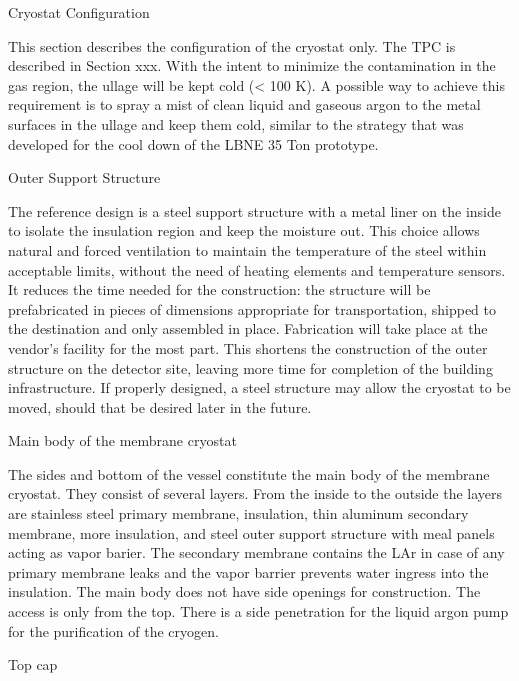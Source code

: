 Cryostat Configuration

This section describes the configuration of the cryostat only. The TPC is described in Section xxx. With the intent to minimize the contamination in the gas region, the ullage will be kept cold (< 100 K). A possible way to achieve this requirement is to spray a mist of clean liquid and gaseous argon to the metal surfaces in the ullage and keep them cold, similar to the strategy that was developed for the cool down of the LBNE 35 Ton prototype.

Outer Support Structure

The reference design is a steel support structure with a metal liner on the inside to isolate the insulation region and keep the moisture out. This choice allows natural and forced ventilation to maintain the temperature of the steel within acceptable limits, without the need of heating elements and temperature sensors. It reduces the time needed for the construction: the structure will be prefabricated in pieces of dimensions appropriate for transportation, shipped to the destination and only assembled in place. Fabrication will take place at the vendor’s facility for the most part. This shortens the construction of the outer structure on the detector site, leaving more time for completion of the building infrastructure. If properly designed, a steel structure may allow the cryostat to be moved, should that be desired later in the future.

Main body of the membrane cryostat

The sides and bottom of the vessel constitute the main body of the membrane cryostat. They consist of several layers. From the inside to the outside the layers are stainless steel primary membrane, insulation, thin aluminum secondary membrane, more insulation, and steel outer support structure with meal panels acting as vapor barier. The secondary membrane contains the LAr in case of any primary membrane leaks and the vapor barrier prevents water ingress into the insulation. The main body does not have side openings for construction. The access is only from the top. There is a side penetration for the liquid argon pump for the purification of the cryogen.

Top cap

